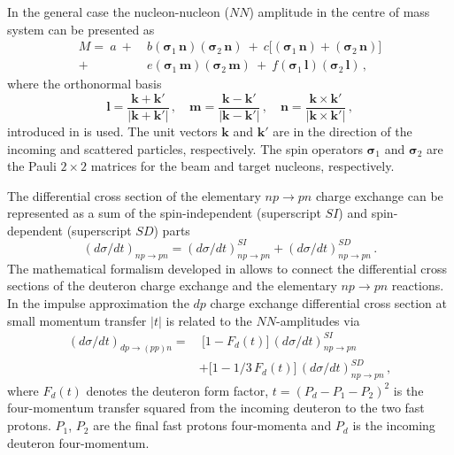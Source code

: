 \documentclass[twocolumn,epjc3]{svjour3}
\newcommand{\np}     {\ensuremath{np \rightarrow pn}\xspace}
\newcommand{\dpchex} {\ensuremath{dp \rightarrow (pp)n}\xspace}
\begin{document}
In the general case the nucleon-nucleon ($NN$) amplitude in the centre of mass
system can be presented as \cite{gla02}
\begin{equation}
  \label{eq:mat_full}
  \begin{split}
    M =\ a\ +\ &b
    (\boldsymbol{\sigma}_1\,\mathbf{n})
    (\boldsymbol{\sigma}_2\,\mathbf{n})\ +\ c\bigl[
    (\boldsymbol{\sigma}_1\,\mathbf{n}) +
    (\boldsymbol{\sigma}_2\,\mathbf{n})\bigr]\\
    +\ &e
    (\boldsymbol{\sigma}_1\,\mathbf{m})
    (\boldsymbol{\sigma}_2\,\mathbf{m})\ +\ f
    (\boldsymbol{\sigma}_1\,\mathbf{l})
    (\boldsymbol{\sigma}_2\,\mathbf{l})\,,
  \end{split}
\end{equation}
where the orthonormal basis
\begin{equation}
  \mathbf{l} =
  \frac{\mathbf{k} + \mathbf{k}'}{|\mathbf{k} + \mathbf{k}'|}\,, \quad
  \mathbf{m} =
  \frac{\mathbf{k} - \mathbf{k}'}{|\mathbf{k} - \mathbf{k}'|}\,, \quad
  \mathbf{n} =
  \frac{\mathbf{k} \times \mathbf{k}'}{|\mathbf{k} \times \mathbf{k}'|}\,,
\end{equation}
introduced in \cite{gol66} is used. The unit vectors $\mathbf{k}$ and
$\mathbf{k}'$ are in the direction of the incoming and scattered particles,
respectively. The spin operators $\boldsymbol{\sigma}_1$ and
$\boldsymbol{\sigma}_2$ are the Pauli $2\times2$ matrices for the beam and
target nucleons, respectively.

The differential cross section of the elementary \np charge exchange can be
represented as a sum of the spin-independent (superscript $SI$) and
spin-dependent (superscript $SD$) parts
\begin{equation}
  \label{eq:np_sum}
  (d\sigma/dt)_{\np} = (d\sigma/dt)^{SI}_{\np} + (d\sigma/dt)^{SD}_{\np}\,.
\end{equation}
The mathematical formalism developed in \cite{dea72, dea72_2, bug87} allows to
connect the differential cross sections of the deuteron charge exchange and the
elementary \np reactions. In the impulse approximation the $dp$ charge exchange
differential cross section at small momentum transfer $|t|$ is related to the
$NN$-amplitudes via
\begin{equation}
  \label{eq:dp_13np}
  \begin{split}
    (d\sigma/dt)_{\dpchex} =&\ \bigl[1 - F_d(t)\bigr]\,(d\sigma/dt)^{SI}_{\np}\\
    &+\bigl[1 - 1/3\,F_d(t)\bigr]\,(d\sigma/dt)^{SD}_{\np}\,,
  \end{split}
\end{equation}
where $F_d(t)$ denotes the deuteron form factor, $t = (P_d - P_1 - P_2)^2$ is
the four-momentum transfer squared from the incoming deuteron to the two fast
protons. $P_1$, $P_2$ are the final fast protons four-momenta and $P_d$ is the
incoming deuteron four-momentum.
\end{document}
